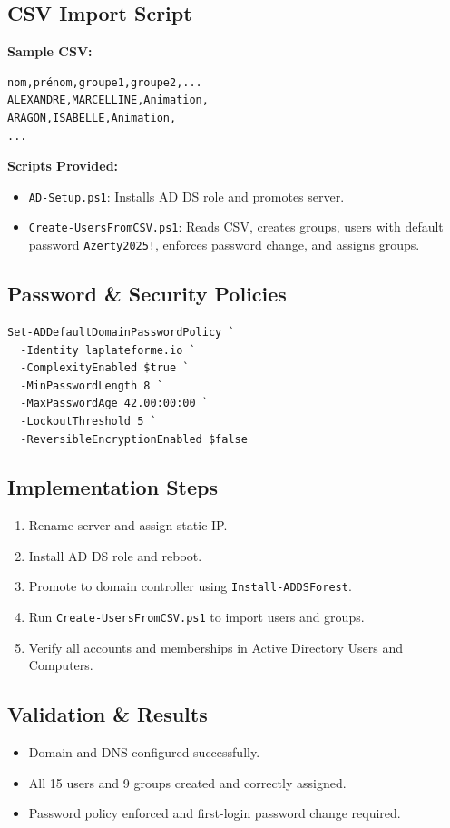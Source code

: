 \documentclass[11pt,a4paper]{article}
\begin{document}
\subsection{CSV Import Script}
\textbf{Sample CSV:}
\begin{verbatim}
nom,prénom,groupe1,groupe2,...
ALEXANDRE,MARCELLINE,Animation,
ARAGON,ISABELLE,Animation,
...
\end{verbatim}

\textbf{Scripts Provided:}
\begin{itemize}
  \item \texttt{AD-Setup.ps1}: Installs AD DS role and promotes server.
  \item \texttt{Create-UsersFromCSV.ps1}: Reads CSV, creates groups, users with default password \texttt{Azerty2025!}, enforces password change, and assigns groups.
\end{itemize}

\subsection{Password \& Security Policies}
\begin{verbatim}
Set-ADDefaultDomainPasswordPolicy `
  -Identity laplateforme.io `
  -ComplexityEnabled $true `
  -MinPasswordLength 8 `
  -MaxPasswordAge 42.00:00:00 `
  -LockoutThreshold 5 `
  -ReversibleEncryptionEnabled $false
\end{verbatim}

\subsection{Implementation Steps}
\begin{enumerate}
  \item Rename server and assign static IP.
  \item Install AD DS role and reboot.
  \item Promote to domain controller using \texttt{Install-ADDSForest}.
  \item Run \texttt{Create-UsersFromCSV.ps1} to import users and groups.
  \item Verify all accounts and memberships in Active Directory Users and Computers.
\end{enumerate}

\subsection{Validation \& Results}
\begin{itemize}
  \item Domain and DNS configured successfully.
  \item All 15 users and 9 groups created and correctly assigned.
  \item Password policy enforced and first-login password change required.
\end{itemize}
\end{document}
